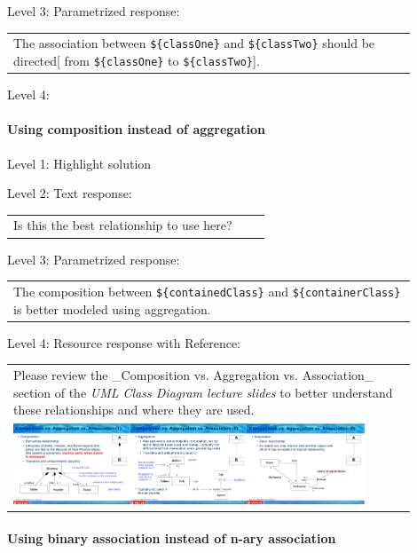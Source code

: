 \noindent Level 3: Parametrized response: \medskip

\begin{tabular}{|p{0.9\linewidth}}
The association between \verb|${classOne}| and \verb|${classTwo}| should be directed[ from \verb|${classOne}| to \verb|${classTwo}|].
\end{tabular} \medskip

\noindent Level 4: 
\paragraph{Using composition instead of aggregation}

\noindent Level 1: Highlight solution \medskip

\noindent Level 2: Text response: \medskip

\begin{tabular}{|p{0.9\linewidth}}
Is this the best relationship to use here?
\end{tabular} \medskip

\noindent Level 3: Parametrized response: \medskip

\begin{tabular}{|p{0.9\linewidth}}
The composition between \verb|${containedClass}| and \verb|${containerClass}| is better modeled using aggregation.
\end{tabular} \medskip

\noindent Level 4: Resource response with Reference: \medskip

\begin{tabular}{|p{0.9\linewidth}}
Please review the _Composition vs. Aggregation vs. Association_ section of 
the \textit{UML Class Diagram lecture slides} to 
better understand these relationships and where they are used.

\\
\includegraphics[width=0.9\textwidth]{images/composition_aggregation_association.png}
\end{tabular} \medskip


\paragraph{Using binary association instead of n-ary association}

